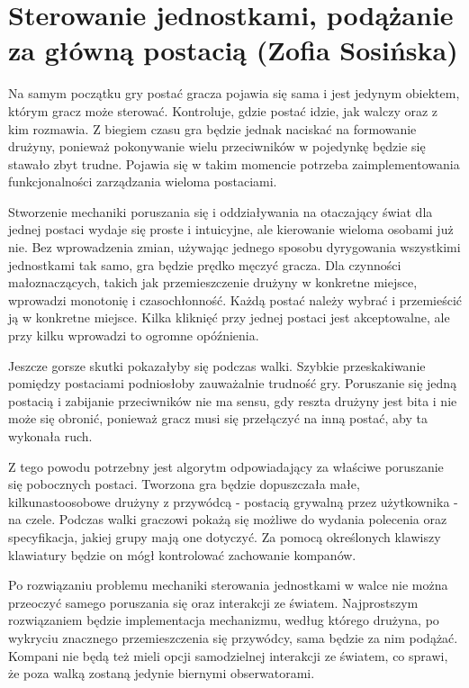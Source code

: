 \section{Sterowanie jednostkami, podążanie za główną postacią (Zofia Sosińska)}\label{chap:sjpzgp}
Na samym początku gry postać gracza pojawia się sama i jest jedynym obiektem, którym gracz może sterować.
Kontroluje, gdzie postać idzie, jak walczy oraz z kim rozmawia. Z biegiem czasu gra będzie jednak naciskać na formowanie drużyny,
ponieważ pokonywanie wielu przeciwników w pojedynkę będzie się stawało zbyt trudne. Pojawia się w takim momencie potrzeba 
zaimplementowania funkcjonalności zarządzania wieloma postaciami.

Stworzenie mechaniki poruszania się i oddziaływania na otaczający świat dla jednej postaci wydaje się proste i intuicyjne, ale kierowanie wieloma osobami już nie. 
Bez wprowadzenia zmian, używając jednego sposobu dyrygowania wszystkimi jednostkami tak samo, gra będzie prędko męczyć gracza.
Dla czynności małoznaczących, takich jak przemieszczenie drużyny w konkretne miejsce, wprowadzi monotonię i czasochłonność.
Każdą postać należy wybrać i przemieścić ją w konkretne miejsce. Kilka kliknięć przy jednej postaci jest akceptowalne, ale przy kilku wprowadzi to ogromne opóźnienia.

Jeszcze gorsze skutki pokazałyby się podczas walki. Szybkie przeskakiwanie pomiędzy postaciami podniosłoby zauważalnie trudność gry.
Poruszanie się jedną postacią i zabijanie przeciwników nie ma sensu, gdy reszta drużyny jest bita i nie może się obronić, ponieważ gracz musi się przełączyć na inną postać,
aby ta wykonała ruch. 

Z tego powodu potrzebny jest algorytm odpowiadający za właściwe poruszanie się pobocznych postaci.
Tworzona gra będzie dopuszczała małe, kilkunastoosobowe drużyny z przywódcą - postacią grywalną przez użytkownika - na czele.
Podczas walki graczowi pokażą się możliwe do wydania polecenia oraz specyfikacja, jakiej grupy mają one dotyczyć.
Za pomocą określonych klawiszy klawiatury będzie on mógł kontrolować zachowanie kompanów.

Po rozwiązaniu problemu mechaniki sterowania jednostkami w walce nie można przeoczyć samego poruszania się oraz interakcji ze światem.
Najprostszym rozwiązaniem będzie implementacja mechanizmu, według którego drużyna, po wykryciu znacznego przemieszczenia się przywódcy, sama będzie za nim podążać.
Kompani nie będą też mieli opcji samodzielnej interakcji ze światem, co sprawi, że poza walką zostaną jedynie biernymi obserwatorami.